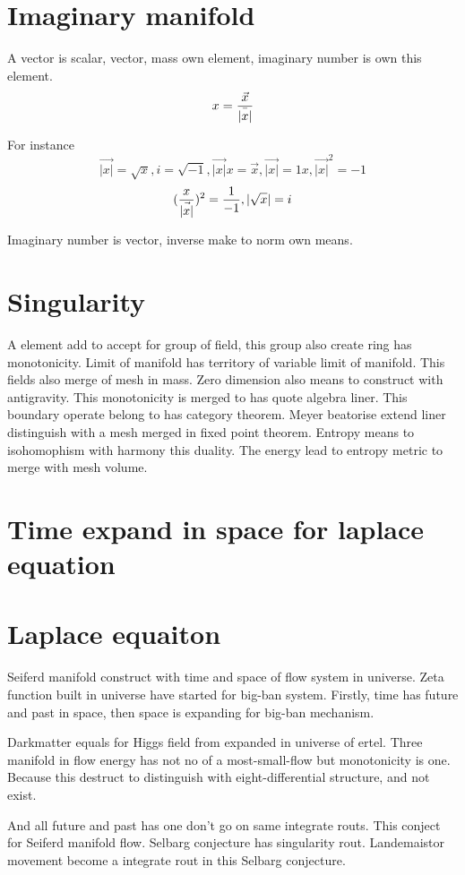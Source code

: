\documentclass{jsarticle}
\begin{document}
\section{Imaginary manifold}
A vector is scalar, vector, mass own element, imaginary number is own this element.
  $$ x = {\vec{x} \over \bar{|x|}} $$

For instance
  $$ \vec{|x|} = \sqrt{x}, i = \sqrt{-1}, \vec{|x|} x = \vec{x}, \vec{|x|} = 1x, \vec{|x|}^2 = -1 $$
  $$ ({x \over \vec{|x|}})^2 = {1 \over -1}, |\sqrt{x}| = i $$

Imaginary number is vector, inverse make to norm own means.

\section{Singularity}

  A element add to accept for group of field, this group also create ring has monotonicity. Limit of manifold
has territory of variable limit of manifold. This fields also merge of mesh in mass. Zero dimension also means
to construct with antigravity. This monotonicity is merged to has quote algebra liner. This boundary operate belong
to has category theorem. Meyer beatorise extend liner distinguish with a mesh merged in fixed point theorem.
Entropy means to isohomophism with harmony this duality. The energy lead to entropy metric to merge with mesh volume.

\section{Time expand in space for laplace equation}
\section{Laplace equaiton}
  Seiferd manifold construct with time and space of flow system in universe. Zeta function built in universe have
started for big-ban system. Firstly, time has future and past in space, then space is expanding for big-ban mechanism.

  Darkmatter equals for Higgs field from expanded in universe of ertel. Three manifold in flow energy has not no of
a most-small-flow but monotonicity is one. Because this destruct to distinguish with eight-differential structure, and
not exist.

  And all future and past has one don't go on same integrate routs. This conject for Seiferd manifold flow. Selbarg
conjecture has singularity rout. Landemaistor movement become a integrate rout in this Selbarg conjecture.
\end{document}
